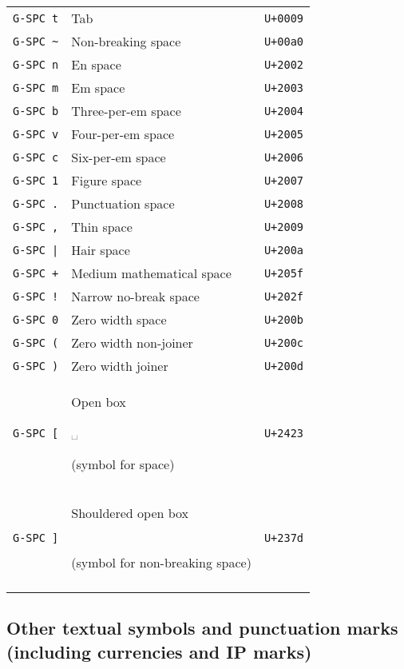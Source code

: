 \documentclass[oneside]{memoir}
\newcommand{\key}{\verb}
\newcommand{\out}[1]{\colorbox{gray!20}{\strut{}#1}}
\newcommand{\uni}[1]{\texttt{#1}}
\begin{document}
{{{\begin{table}
\begin{minipage}{0.5\paperwidth}
\begin{tabular}{lll}
\midrule
\key|G-SPC t| & Tab                                 & \uni{U+0009} \\
\key|G-SPC ~| & Non-breaking space                  & \uni{U+00a0} \\
\key|G-SPC n| & En space                            & \uni{U+2002} \\
\key|G-SPC m| & Em space                            & \uni{U+2003} \\
\key|G-SPC b| & Three-per-em space                  & \uni{U+2004} \\
\key|G-SPC v| & Four-per-em space                   & \uni{U+2005} \\
\key|G-SPC c| & Six-per-em space                    & \uni{U+2006} \\
\key|G-SPC 1| & Figure space                        & \uni{U+2007} \\
\key|G-SPC .| & Punctuation space                   & \uni{U+2008} \\
\key|G-SPC ,| & Thin space                          & \uni{U+2009} \\
\key!G-SPC |! & Hair space                          & \uni{U+200a} \\
\key|G-SPC +| & Medium mathematical space           & \uni{U+205f} \\
\key|G-SPC !| & Narrow no-break space               & \uni{U+202f} \\
\key|G-SPC 0| & Zero width space                    & \uni{U+200b} \\
\key|G-SPC (| & Zero width non-joiner               & \uni{U+200c} \\
\key|G-SPC )| & Zero width joiner                   & \uni{U+200d} \\
\key|G-SPC [| & Open box \out{␣} (symbol for space) & \uni{U+2423} \\
\key|G-SPC ]|
  & \makecell{Shouldered open box \out{\tfbs{⍽}}\\\quad(symbol for non-breaking space)}
  & \uni{U+237d} \\
\bottomrule&&
\end{tabular}
\end{minipage}
\end{table}

\subsection{Other textual symbols and punctuation marks (including currencies and IP marks)}
\label{sec:symbols_punctuation}

}}}
\end{document}
